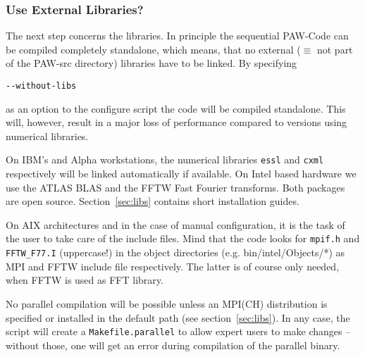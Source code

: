 \documentclass[a4paper,10pt]{article}
\newcommand{\PAW}{\textsc{PAW}}
\begin{document}
\subsubsection*{Use External Libraries?}
\label{sub:libs}
The next step concerns the libraries.  In principle the sequential \PAW-Code
can be compiled completely standalone, which means, that no external ($\equiv$
not part of the \PAW-src directory) libraries have to be linked.  By specifying
\begin{verbatim}
--without-libs
\end{verbatim}
as an option to the configure script the code will be compiled standalone.
This will, however, result in a major loss of performance compared to versions
using numerical libraries.

On IBM's and Alpha workstations, the numerical libraries \texttt{essl} and
\texttt{cxml} respectively will be linked automatically if available.  On Intel
based hardware we use the \mbox{ATLAS} \mbox{BLAS} and the \mbox{FFTW} Fast
Fourier transforms. Both packages are open source.  Section~\ref{sec:libs}
contains short installation guides.

On AIX architectures and in the case of manual configuration, it is the task of
the user to take care of the include files.  Mind that the code looks for
\texttt{mpif.h} and \texttt{FFTW\_F77.I} (uppercase!) in the object directories
(e.g. bin/intel/Objects/*) as MPI and FFTW include file respectively.  The
latter is of course only needed, when FFTW is used as FFT library.

No parallel compilation will be possible unless an MPI(CH) distribution is
specified or installed in the default path (see section~\ref{sec:libs}).  In
any case, the script will create a \texttt{Makefile.parallel} to allow expert
users to make changes -- without those, one will get an error during
compilation of the parallel binary.  
\end{document}
